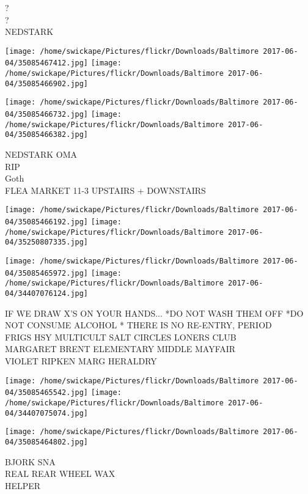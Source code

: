 \documentclass[10pt,letterpaper]{article}
\begin{document}
?\\
?\\
NEDSTARK\\
\pagebreak

\texttt{[image: /home/swickape/Pictures/flickr/Downloads/Baltimore 2017-06-04/35085467412.jpg]}
\texttt{[image: /home/swickape/Pictures/flickr/Downloads/Baltimore 2017-06-04/35085466902.jpg]}

\texttt{[image: /home/swickape/Pictures/flickr/Downloads/Baltimore 2017-06-04/35085466732.jpg]}
\texttt{[image: /home/swickape/Pictures/flickr/Downloads/Baltimore 2017-06-04/35085466382.jpg]}

NEDSTARK OMA\\
RIP\\
Goth\\
FLEA MARKET 11{-}3 UPSTAIRS + DOWNSTAIRS\\
\pagebreak

\texttt{[image: /home/swickape/Pictures/flickr/Downloads/Baltimore 2017-06-04/35085466192.jpg]}
\texttt{[image: /home/swickape/Pictures/flickr/Downloads/Baltimore 2017-06-04/35250807335.jpg]}

\texttt{[image: /home/swickape/Pictures/flickr/Downloads/Baltimore 2017-06-04/35085465972.jpg]}
\texttt{[image: /home/swickape/Pictures/flickr/Downloads/Baltimore 2017-06-04/34407076124.jpg]}

IF WE DRAW X'S ON YOUR HANDS... *DO NOT WASH THEM OFF *DO NOT CONSUME ALCOHOL * THERE IS NO RE{-}ENTRY, PERIOD\\
FRIGS HSY MULTICULT SALT CIRCLES LONERS CLUB\\
MARGARET BRENT ELEMENTARY MIDDLE MAYFAIR\\
VIOLET RIPKEN MARG HERALDRY\\
\pagebreak

\texttt{[image: /home/swickape/Pictures/flickr/Downloads/Baltimore 2017-06-04/35085465542.jpg]}
\texttt{[image: /home/swickape/Pictures/flickr/Downloads/Baltimore 2017-06-04/34407075074.jpg]}

\vspace{0.25in}
\texttt{[image: /home/swickape/Pictures/flickr/Downloads/Baltimore 2017-06-04/35085464802.jpg]}

BJORK SNA\\
REAL REAR WHEEL WAX\\
HELPER\\
\pagebreak
\end{document}
